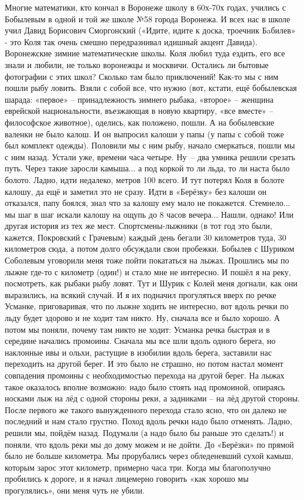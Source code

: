 Многие математики, кто кончал в Воронеже школу в 60х-70х годах, учились с Бобылевым в одной и той же школе №58 города Воронежа. И всех нас в школе учил Давид Борисович Сморгонский («Идите, идите к доска, троечник Бaбилев» - это Коля так очень смешно передразнивал идишный акцент Давида). Воронежские зимние математические школы. Коля любил туда ездить, его все знали и любили, не только воронежцы и москвичи. Остались ли бытовые фотографии с этих школ? Сколько там было приключений! Как-то мы с ним пошли рыбу ловить. Взяли с собой все, что нужно (вот, кстати, ещё бобылевская шарада: «первое» – принадлежность зимнего рыбака, «второе» – женщина еврейской национальности, въезжающая в новую квартиру, «все вместе» – философское животное), оделись, как положено, пошли. А на бобылевские валенки не было калош. И он выпросил калоши у папы (у папы с собой тоже был комплект одежды). Половили мы с ним рыбу, начало смеркаться, пошли мы с ним назад. Устали уже, времени часа четыре. Ну~– два умника решили срезать путь. Через такие заросли камыша... а под коркой то ли льда, то ли наста было болото. Ладно, идти недалеко, метров 100 всего. И тут потерял Коля в болоте калошу, да ещё и заметил это не сразу. Идти в «Берёзку» без калоши он отказался, папу боялся, знал что за калошу ему мало не покажется. Стемнело... мы шаг в шаг искали калошу на ощупь до 8 часов вечера... Нашли, однако! Или другая история из тех же мест. Спортсмены-лыжники (в тот год это были, кажется, Покровский с Грачевым) каждый день бегали 30 километров туда, 30 километров сюда, а потом долго обсуждали свои пробежки. Бобылев с Шуриком Соболевым уговорили меня тоже пойти покататься на лыжах. Прошлись мы по лыжне где-то с километр (один!) и стало мне не интересно. И пошёл я на реку, посмотреть, как рыбаки рыбу ловят. Тут и Шурик с Колей меня догнали, как они выразились, на всякий случай. И я их подначил прогуляться вверх по речке Усманке, приговаривая, что по лыжне ходить не интересно, вот вдоль речки по льду будет здорово и не ходит там никто. Ну, сначала все и было хорошо. А потом мы поняли, почему там никто не ходит: Усманка речка быстрая и в середине начались промоины. Сначала мы все шли вдоль одного берега, но наклонные ивы и ольхи, растущие в изобилии вдоль берега, заставили нас переходить на другой берег. И это было не страшно, но потом настал момент совпадения промоины с необходимостью перехода на другой берег. На лыжах такое оказалось вполне возможно: надо было стоять над промоиной, опираясь носками лыж на лёд с одной стороны реки, а задниками – на лёд другой стороны. После первого же такого вынужденного перехода стало ясно, что он далеко не последний и нам стало грустно. Поход вдоль речки надо было отменять. Ладно, решили мы, пойдём назад. Подумали (а надо было бы раньше это сделать!) и поняли, что вдоль реки мы до дому можем и не дойти. До «Берёзки» по прямой было не больше километра. Мы прорубались через обледеневший сухой камыш, которым зарос этот километр, примерно часа три. Когда мы благополучно пробились к дороге, и я начал лицемерно говорить «как хорошо мы прогулялись», они меня чуть не убили.

